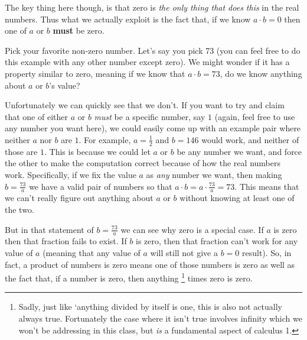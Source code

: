 \documentclass{ximeraXloud}
\begin{document}
    The key thing here though, is that zero is \textit{the only thing that does this} in the real numbers. Thus what we actually exploit is the fact that, if we know $a \cdot b = 0$ then one of $a$ or $b$ \textbf{must} be zero.
    
    \begin{explanation}%
        Pick your favorite non-zero number. Let's say you pick 73 (you can feel free to do this example with any other number except zero). We might wonder if it has a property similar to zero, meaning if we know that $a \cdot b = 73$, do we know anything about $a$ or $b$'s value?
    
        Unfortunately we can quickly see that we don't. If you want to try and claim that one of either $a$ or $b$ \textit{must} be a specific number, say $1$ (again, feel free to use any number you want here), we could easily come up with an example pair where neither $a$ nor $b$ are $1$. For example, $a = \frac{1}{2}$ and $b = 146$ would work, and neither of those are $1$. This is because we could let $a$ or $b$ be any number we want, and force the other to make the computation correct because of how the real numbers work. Specifically, if we fix the value $a$ as \textit{any} number we want, then making $b = \frac{73}{a}$ we have a valid pair of numbers so that $a \cdot b = a \cdot \frac{73}{a} =73$. This means that we can't really figure out anything about $a$ or $b$ without knowing at least one of the two.
    
        But in that statement of $b = \frac{73}{a}$ we can see why zero is a special case. If $a$ is zero then that fraction fails to exist. If $b$ is zero, then that fraction can't work for any value of $a$ (meaning that any value of $a$ will still not give a $b = 0$ result). So, in fact, a product of numbers is zero means one of those numbers is zero as well as the fact that, if a number is zero, then anything%
        \footnote{%
            Sadly, just like `anything divided by itself is one, this is also not actually always true. Fortunately the case where it isn't true involves infinity which we won't be addressing in this class, but \textit{is} a fundamental aspect of calculus 1.%
            }
        times zero is zero.
    
    \end{explanation}%
\end{document}
